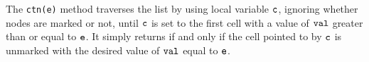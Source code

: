 The {\tt ctn(e)} method traverses the list by using local variable $\tt c$, ignoring whether nodes are marked or not, until $\tt c$ is set to the
first cell with a value of $\tt val$ greater than or equal to $\tt e$. It simply returns \true \; if and only if the cell pointed to by $\tt c$  is unmarked with the desired value of $\tt val$ equal to $\tt e$. 
%    
%
%    
%    
%        
%    
%    

